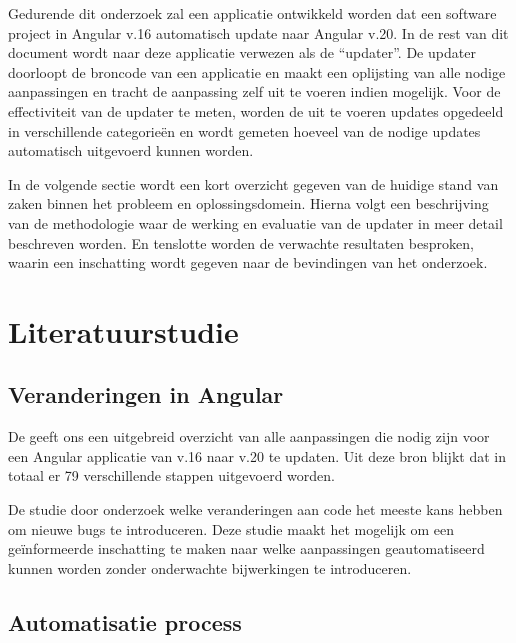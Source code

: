 Gedurende dit onderzoek zal een applicatie ontwikkeld worden dat een software project in Angular v.16 automatisch update naar Angular v.20.
In de rest van dit document wordt naar deze applicatie verwezen als de ``updater''.
De updater doorloopt de broncode van een applicatie en maakt een oplijsting van alle nodige aanpassingen en tracht de aanpassing zelf uit te voeren indien mogelijk.
Voor de effectiviteit van de updater te meten, worden de uit te voeren updates opgedeeld in verschillende categorieën en wordt gemeten hoeveel van de nodige updates automatisch uitgevoerd kunnen worden.

In de volgende sectie wordt een kort overzicht gegeven van de huidige stand van zaken binnen het probleem en oplossingsdomein.
Hierna volgt een beschrijving van de methodologie waar de werking en evaluatie van de updater in meer detail beschreven worden.
En tenslotte worden de verwachte resultaten besproken, waarin een inschatting wordt gegeven naar de bevindingen van het onderzoek.

\section{Literatuurstudie}
\label{sec:literatuurstudie}

\subsection{Veranderingen in Angular}

De \textcite{AngularUpdateGuide2025} geeft ons een uitgebreid overzicht van alle aanpassingen die nodig zijn voor een Angular applicatie van v.16 naar v.20 te updaten. 
Uit deze bron blijkt dat in totaal er 79 verschillende stappen uitgevoerd worden.

De studie door \textcite{Di2020} onderzoek welke veranderingen aan code het meeste kans hebben om nieuwe bugs te introduceren.
Deze studie maakt het mogelijk om een geïnformeerde inschatting te maken naar welke aanpassingen geautomatiseerd kunnen worden zonder onderwachte bijwerkingen te introduceren.

\subsection{Automatisatie process}

